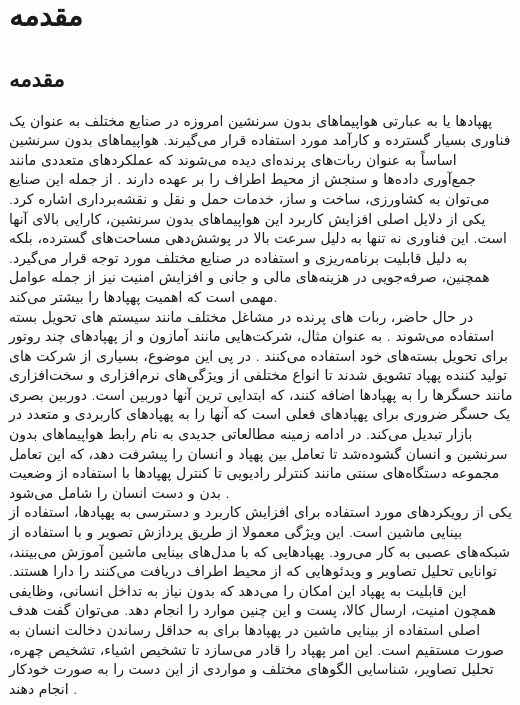 \chapter{مقدمه}
\section{مقدمه}
پهپاد‌ها یا به عبارتی هواپیماهای بدون سرنشین امروزه در صنایع مختلف به عنوان یک فناوری
 ‌بسیار گسترده و کارآمد مورد استفاده قرار می‌گیرند. هواپیماهای بدون سرنشین اساساً به عنوان ربات‌های پرنده‌ای
 دیده می‌شوند که عملکردهای متعددی مانند جمع‌آوری داده‌ها و سنجش از محیط اطراف را بر عهده دارند \cite{waltergesture}.
 از جمله این صنایع می‌توان به کشاورزی، ساخت و ساز، خدمات حمل و نقل و نقشه‌برداری اشاره کرد. یکی از دلایل
 اصلی افزایش کاربرد این هواپیما‌های بدون سرنشین، کارایی بالای آنها است. این فناوری نه تنها به دلیل سرعت بالا در پوشش‌دهی
 مساحت‌های گسترده، بلکه به دلیل قابلیت برنامه‌ریزی و استفاده در صنایع مختلف مورد توجه قرار می‌گیرد.
 همچنین، صرفه‌جویی در هزینه‌های مالی و جانی و افزایش امنیت نیز از جمله عوامل مهمی است که اهمیت پهپادها را بیشتر می‌کند\cite{puri2017agriculture}.
 \\
 در حال حاضر، ربات های پرنده در مشاغل مختلف مانند سیستم های تحویل بسته استفاده می‌شوند \cite{gatteschi2015new}. به عنوان مثال، شرکت‌هایی مانند آمازون و 
  از پهپادهای چند روتور برای تحویل بسته‌های خود استفاده می‌کنند \cite{moore2014nypd}. 
 در پی این موضوع، بسیاری از شرکت های تولید کننده
  پهپاد تشویق شدند تا انواع مختلفی از ویژگی‌های نرم‌افزاری و سخت‌افزاری
 مانند حسگرها را به پهپاد‌ها اضافه کنند، که ابتدایی ترین
  آنها دوربین است. دوربین بصری یک حسگر ضروری برای پهپادهای فعلی
  است که آنها را به پهپادهای کاربردی و متعدد در بازار تبدیل می‌کند\cite{natarajan2018hand}. در ادامه زمینه مطالعاتی جدیدی به نام رابط هواپیماهای بدون سرنشین و
   انسان گشوده‌شد تا تعامل بین پهپاد و 
 انسان را پیشرفت دهد، که این تعامل مجموعه‌ دستگاه‌های سنتی مانند کنترلر رادیویی تا کنترل پهپادها با استفاده از وضعیت بدن و دست انسان را شامل می‌شود \cite{hadri2018hand}.
 \\
 یکی از رویکردهای مورد استفاده برای افزایش کاربرد و دسترسی به پهپادها، استفاده از بینایی ماشین است. این ویژگی معمولا از طریق پردازش تصویر
 و با استفاده از شبکه‌های عصبی به کار می‌رود. پهپاد‌هایی که با مدل‌های بینایی ماشین آموزش می‌بینند، توانایی تحلیل تصاویر و ویدئو‌هایی که از محیط اطراف
 دریافت می‌کنند را دارا هستند. این قابلیت به پهپاد این امکان را می‌دهد که بدون نیاز به تداخل انسانی، وظایفی همچون امنیت، ارسال کالا، پست و این چنین موارد را انجام دهد\cite{zhu2018vision}.
 می‌توان گفت هدف اصلی استفاده از بینایی ماشین در پهپاد‌ها برای به حداقل رساندن دخالت انسان به صورت مستقیم است. این
 امر پهپاد را قادر می‌سازد تا تشخیص اشیاء، تشخیص چهره، تحلیل تصاویر، شناسایی الگوهای مختلف و مواردی از این دست را به صورت خودکار انجام دهند \cite{guvenc2018detection}.

